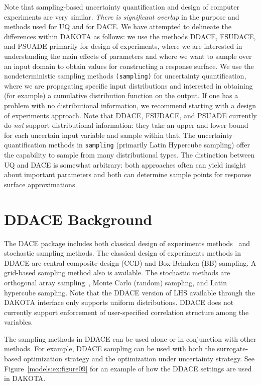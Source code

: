 Note that sampling-based uncertainty quantification and design of
computer experiments are very similar.  \emph{There is significant
overlap} in the purpose and methods used for UQ and for DACE.  We have
attempted to delineate the differences within DAKOTA as follows: we
use the methods DDACE, FSUDACE, and PSUADE primarily for design of
experiments, where we are interested in understanding the main effects
of parameters and where we want to sample over an input domain to
obtain values for constructing a response surface.  We use the
nondeterministic sampling methods \texttt{(sampling)} for
uncertainty quantification, where we are propagating specific input
distributions and interested in obtaining (for example) a cumulative
distribution function on the output.  If one has a problem with no
distributional information, we recommend starting with a design of
experiments approach.  Note that DDACE, FSUDACE, and PSUADE currently
do \emph{not} support distributional information: they take an upper
and lower bound for each uncertain input variable and sample within
that.  The uncertainty quantification methods in
\texttt{sampling} (primarily Latin Hypercube sampling) offer the
capability to sample from many distributional types.  The distinction
between UQ and DACE is somewhat arbitrary: both approaches often can
yield insight about important parameters and both can determine sample
points for response surface approximations.

\section{DDACE Background}\label{dace:ddace}

The DACE package includes both classical design of experiments
methods~\cite{TonXX} and stochastic sampling methods. The classical
design of experiments methods in DDACE are central composite design
(CCD) and Box-Behnken (BB) sampling. A grid-based sampling method also
is available. The stochastic methods are orthogonal array
sampling~\cite{Koe96}, Monte Carlo (random) sampling, and Latin
hypercube sampling.  Note that the DDACE version of LHS available through the
DAKOTA interface only supports uniform distributions.  DDACE does not
currently support enforcement of user-specified correlation structure
among the variables.

The sampling methods in DDACE can be used alone or in conjunction with
other methods. For example, DDACE sampling can be used with both the
surrogate-based optimization strategy and the optimization under
uncertainty strategy. See Figure~\ref{models:ex:figure09} for an
example of how the DDACE settings are used in DAKOTA.

